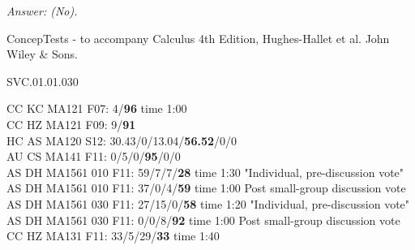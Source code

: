 {\it Answer: (No).} 


\medskip
ConcepTests - to accompany Calculus 4th Edition, Hughes-Hallet et al. John Wiley \& Sons.

SVC.01.01.030



CC KC MA121 F07: 4/{\bf 96} time 1:00 \\
CC HZ MA121 F09: 9/{\bf91}  \\
HC AS MA120 S12: 30.43/0/13.04/{\bf56.52}/0/0  \\
AU CS MA141 F11: 0/5/0/{\bf95}/0/0  \\
AS DH MA1561 010 F11: 59/7/7/{\bf28} time 1:30 "Individual, pre-discussion vote" \\
AS DH MA1561 010 F11: 37/0/4/{\bf59} time 1:00 Post small-group discussion vote \\
AS DH MA1561 030 F11: 27/15/0/{\bf58} time 1:20 "Individual, pre-discussion vote" \\
AS DH MA1561 030 F11: 0/0/8/{\bf92} time 1:00 Post small-group discussion vote \\
CC HZ MA131 F11: 33/5/29/{\bf33} time 1:40  \\
